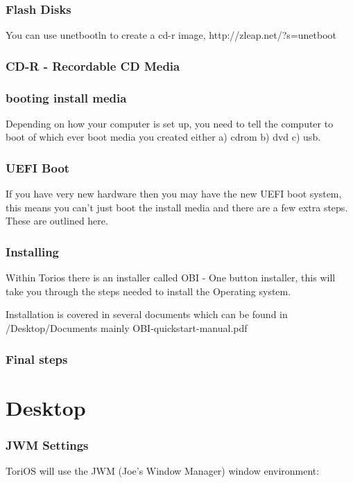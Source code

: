 \documentclass[12pt,a4paper]{book}
\begin{document}
\subsection{Flash Disks}

You can use unetbootln to create a cd-r image,   http://zleap.net/?s=unetboot

\subsection{CD-R - Recordable CD Media}

\subsection{booting install media}
Depending on how your computer is set up,  you need to tell the computer to boot of which ever boot media you created either a) cdrom b) dvd c) usb.

\subsection{UEFI Boot}
If you have very new hardware then you may have the new UEFI boot system,  this means you can't just boot the install media and there are a few extra steps.  These are outlined here.
\subsection{Installing}

Within Torios there is an installer called OBI - One button installer,  this will take you through the steps needed to install the Operating system. 

Installation is covered in several documents which can be found in /Desktop/Documents
mainly 
OBI-quickstart-manual.pdf
\subsection{Final steps}
\chapter{Desktop}

\subsection{JWM Settings}
ToriOS will use the JWM (Joe's Window Manager) window environment:\\
\end{document}
